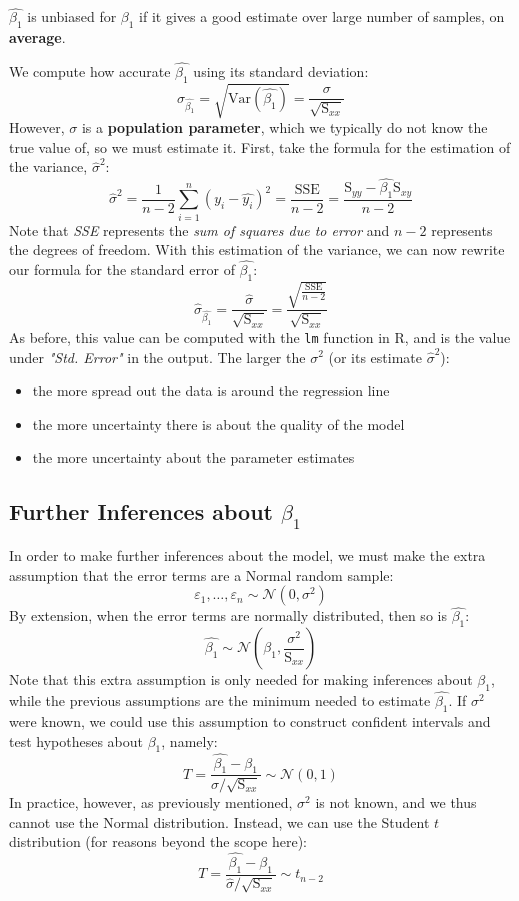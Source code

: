 \documentclass[12pt]{article}
\begin{document}
\begin{definitionEnd}[Unbiasedness]
    $\hat{\beta_1}$ is unbiased for $\beta_1$ if it gives a good estimate over large number of samples, on \textbf{average}.
\end{definitionEnd}

We compute how accurate $\hat{\beta_1}$ using its standard deviation: \[\sigma_{\hat{\beta_1}} = \sqrt{\text{Var}(\hat{\beta_1})} = \frac{\sigma}{\sqrt{\text{S}_{xx}}}\] However, $\sigma$ is a \textbf{population parameter}, which we typically do not know the true value of, so we must estimate it. First, take the formula for the estimation of the variance, $\hat{\sigma}^2$:\[\hat{\sigma}^2 = \frac{1}{n-2}\sum_{i=1}^n(y_i-\hat{y_i})^2 = \frac{\text{SSE}}{n-2} = \frac{\text{S}_{yy}- \hat{\beta_1} \text{S}_{xy}}{n - 2}\] Note that \textit{SSE} represents the \textit{sum of squares due to error} and $n-2$ represents the degrees of freedom. With this estimation of the variance, we can now rewrite our formula for the standard error of $\hat{\beta_1}$:\[\hat{\sigma}_{\hat{\beta_1}} = \frac{\hat{\sigma}}{\sqrt{\text{S}_{xx}}} = \frac{\sqrt{\frac{\text{SSE}}{n-2}}}{\sqrt{\text{S}_{xx}}}\] As before, this value can be computed with the \lstinline[language=R]{lm} function in R, and is the value under \textit{"Std. Error"} in the output. The larger the $\sigma^2$ (or its estimate $\hat{\sigma}^2$):
\begin{itemize}
    \item the more spread out the data is around the regression line
    \item the more uncertainty there is about the quality of the model
    \item the more uncertainty about the parameter estimates
\end{itemize}
\subsection{\texorpdfstring{Further Inferences about $\beta_1$}{Further Inferences about the Linear Coefficient}}

In order to make further inferences about the model, we must make the extra assumption that the error terms are a Normal random sample: \[\varepsilon_1, \dots, \varepsilon_n \sim \mathcal{N}(0, \sigma^2)\] By extension, when the error terms are normally distributed, then so is $\hat{\beta_1}$: \[\hat{\beta_1} \sim \mathcal{N}(\beta_1, \frac{\sigma^2}{\text{S}_{xx}})\] Note that this extra assumption is only needed for making inferences about $\beta_1$, while the previous assumptions are the minimum needed to estimate $\hat{\beta_1}$.
If $\sigma^2$ were known, we could use this assumption to construct confident intervals and test hypotheses about $\beta_1$, namely: \[T = \frac{\hat{\beta_1} - \beta_1}{\sigma / \sqrt{\text{S}_{xx}}} \sim \mathcal{N}(0, 1)\] In practice, however, as previously mentioned, $\sigma^2$ is not known, and we thus cannot use the Normal distribution. Instead, we can use the Student $t$ distribution (for reasons beyond the scope here): \[T = \frac{\hat{\beta_1} - \beta_1}{\hat{\sigma}/\sqrt{\text{S}_{xx}}} \sim t_{n-2}\]
\end{document}
